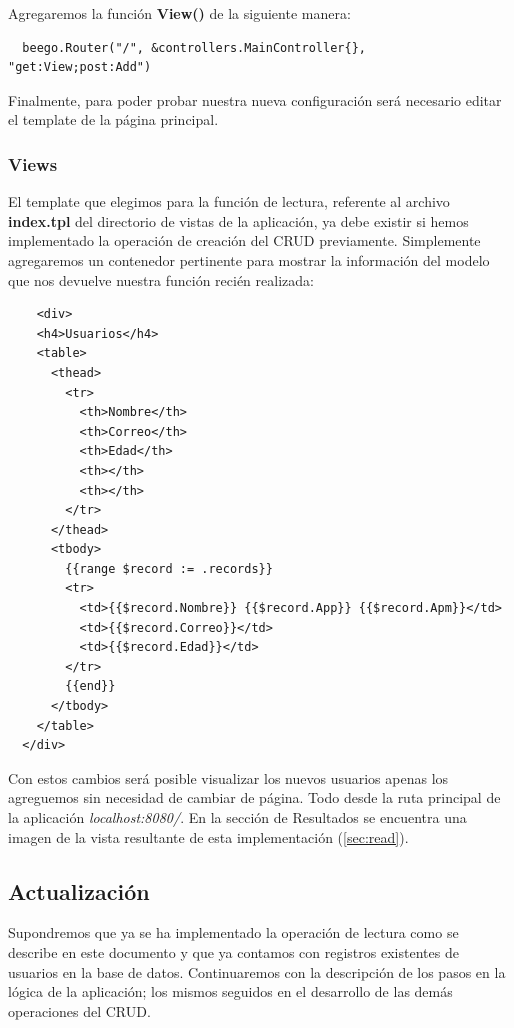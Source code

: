 \documentclass[12pt]{article}
\begin{document}
\noindent Agregaremos la función \textbf{View()} de la siguiente manera:
\begin{verbatim}
  beego.Router("/", &controllers.MainController{}, "get:View;post:Add")
\end{verbatim}
Finalmente, para poder probar nuestra nueva configuración será necesario editar el template de la página principal.
\subsubsection{Views}
El template que elegimos para la función de lectura, referente al archivo \textbf{index.tpl}
del directorio de vistas de la aplicación, ya debe existir si hemos implementado la operación
de creación del CRUD previamente. Simplemente agregaremos un contenedor pertinente para mostrar
la información del modelo que nos devuelve nuestra función recién realizada:
\begin{verbatim}
    <div>
    <h4>Usuarios</h4>
    <table>
      <thead>
        <tr>
          <th>Nombre</th>
          <th>Correo</th>
          <th>Edad</th>
          <th></th>
          <th></th>
        </tr>
      </thead>
      <tbody>
        {{range $record := .records}}
        <tr>
          <td>{{$record.Nombre}} {{$record.App}} {{$record.Apm}}</td>
          <td>{{$record.Correo}}</td>
          <td>{{$record.Edad}}</td>
        </tr>
        {{end}}
      </tbody>
    </table>
  </div>
\end{verbatim}
Con estos cambios será posible visualizar los nuevos usuarios apenas los agreguemos sin necesidad
de cambiar de página. Todo desde la ruta principal de la aplicación \textit{localhost:8080/}.
En la sección de Resultados se encuentra una imagen de la vista resultante de esta
implementación (\ref{sec:read}).
\subsection{Actualización}
Supondremos que ya se ha implementado la operación de lectura como se describe en este documento
y que ya contamos con registros existentes de usuarios en la base de datos.
Continuaremos con la descripción de los pasos en la lógica de la aplicación; los mismos
seguidos en el desarrollo de las demás operaciones del CRUD.
\end{document}
